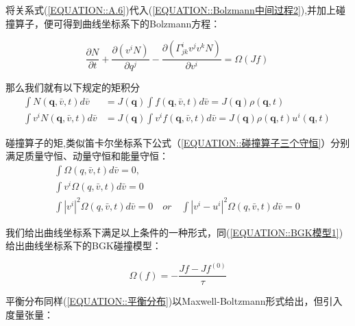 \documentclass[LBMDerivation.tex]{subfiles}
\begin{document}
%

将关系式(\ref{EQUATION::A.6})代入(\ref{EQUATION::Bolzmann中间过程2}),并加上碰撞算子，便可得到曲线坐标系下的Bolzmann方程：

\begin{equation}
  \boxed{
    \frac{\partial N}{\partial t}+\frac{\partial (v^i N)}{\partial q^{j}} -  \frac{\partial ( \Gamma_{j k}^{i} v^{j} v^{k}  N)}{\partial  v^i } =\Omega(Jf)
  }
  \label{EQUATION::Bolzamman 曲线} ~
\end{equation}










那么我们就有以下规定的矩积分
%
%
\begin{equation}
  \begin{aligned}
    \int N(\boldsymbol{q}, \bar{v}, t)   d \bar{v}     & =J(\boldsymbol{q}) \int f(\boldsymbol{q}, \bar{v}, t)d \bar{v} =J(\boldsymbol{q}) \rho(\boldsymbol{q}, t)                                \\
    \int v^{i} N(\boldsymbol{q}, \bar{v}, t) d \bar{v} & =J(\boldsymbol{q}) \int v^{i} f(\boldsymbol{q}, \bar{v}, t)d \bar{v} =J(\boldsymbol{q}) \rho(\boldsymbol{q}, t) u^{i}(\boldsymbol{q}, t)
  \end{aligned}
  \label{EQUATION::A.11} ~
\end{equation}
%
%

碰撞算子的矩,类似笛卡尔坐标系下公式（\ref{EQUATION::碰撞算子三个守恒}）分别满足质量守恒、动量守恒和能量守恒：
\begin{equation}
  \begin{aligned}
    \int  \Omega(q, \bar{v}, t)d \bar{v}=0,      \\
    \int  v^{i} \Omega(q, \bar{v}, t)d \bar{v}=0 \\
    \int|v^i|^2 \Omega(q, \bar{v}, t) d \bar{v} =0 \quad or \quad \int |v^i-u^i|^2 \Omega(q, \bar{v}, t) d \bar{v} =0
  \end{aligned}
  \label{EQUATION::碰撞特性} ~
\end{equation}
%

我们给出曲线坐标系下满足以上条件的一种形式，同(\ref{EQUATION::BGK模型1})给出曲线坐标系下的BGK碰撞模型：

\begin{equation}
  \boxed{
  \Omega(f)= -\frac{Jf-Jf^{(0)}}{\tau}
  }
\end{equation}


平衡分布同样(\ref{EQUATION::平衡分布})以Maxwell-Boltzmann形式给出，但引入度量张量：
%
%
\end{document}
